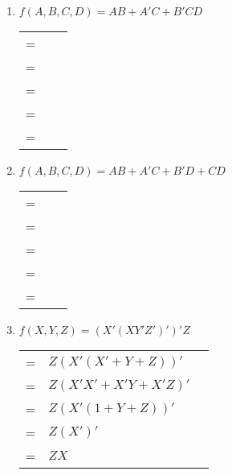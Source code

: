 \documentclass[12pt]{article}
\begin{document}
\begin{enumerate}
    \pagebreak
    
    \item $f(A, B, C, D) = AB + A'C + B'CD$ \\
    \begin{tabular}{r l l}
        = & $ $ & \\
        = & $ $ & \\
        = & $ $ & \\
        = & $ $ & \\
        = & $ $ & \\
    \end{tabular}
    
    \pagebreak
    
    \item $f(A, B, C, D) = AB + A'C + B'D + CD$ \\
    \begin{tabular}{r l l}
        = & $ $ & \\
        = & $ $ & \\
        = & $ $ & \\
        = & $ $ & \\
        = & $ $ & \\
    \end{tabular}
    
    \pagebreak
    
    \item $f(X, Y, Z) = (X'(XY'Z')')'Z$ \\
    \begin{tabular}{r l l}
        = & $Z(X'(X' + Y + Z))'$ & \\
        = & $Z(X'X' + X'Y + X'Z)'$ & \\
        = & $Z(X'(1 + Y + Z))'$ & \\
        = & $Z(X')'$ & \\
        = & $ZX$ & \\
    \end{tabular}

\end{enumerate}
\end{document}
